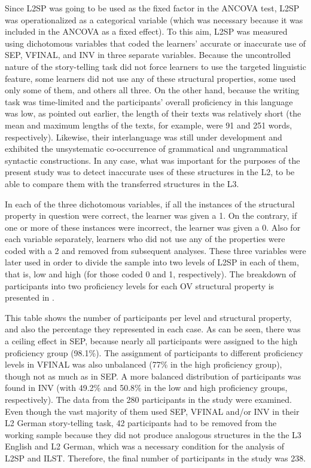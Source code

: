 \documentclass[output=paper,modfonts,nonflat, newtxmath]{langsci/langscibook}
\begin{document}
Since L2SP was going to be used as the fixed factor in the ANCOVA test, L2SP was operationalized as a categorical variable (which was necessary because it was included in the ANCOVA as a fixed effect). To this aim, L2SP was measured using dichotomous variables that coded the learners’ accurate or inaccurate use of SEP, VFINAL, and INV in three separate variables. Because the uncontrolled nature of the story-telling task did not force learners to use the targeted linguistic feature, some learners did not use any of these structural properties, some used only some of them, and others all three. On the other hand, because the writing task was time-limited and the participants’ overall proficiency in this language was low, as pointed out earlier, the length of their texts was relatively short (the mean and maximum lengths of the texts, for example, were 91 and 251 words, respectively). Likewise, their interlanguage was still under development and exhibited the unsystematic co-occurrence of grammatical and ungrammatical syntactic constructions. In any case, what was important for the purposes of the present study was to detect inaccurate uses of these structures in the L2, to be able to compare them with the transferred structures in the L3.

In each of the three dichotomous variables, if all the instances of the structural property in question were correct, the learner was given a 1. On the contrary, if one or more of these instances were incorrect, the learner was given a 0. Also for each variable separately, learners who did not use any of the properties were coded with a 2 and removed from subsequent analyses. These three variables were later used in order to divide the sample into two levels of L2SP in each of them, that is, low and high (for those coded 0 and 1, respectively). The breakdown of participants into two proficiency levels for each OV structural property is presented in .

This table shows the number of participants per level and structural property, and also the percentage they represented in each case. As can be seen, there was a ceiling effect in SEP, because nearly all participants were assigned to the high proficiency group (98.1\%). The assignment of participants to different proficiency levels in VFINAL was also unbalanced (77\% in the high proficiency group), though not as much as in SEP. A more balanced distribution of participants was found in INV (with 49.2\% and 50.8\% in the low and high proficiency groups, respectively). The data from the 280 participants in the study were examined. Even though the vast majority of them used SEP, VFINAL and/or INV in their L2 German story-telling task, 42 participants had to be removed from the working sample because they did not produce analogous structures in the the L3 English and L2 German, which was a necessary condition for the analysis of L2SP and ILST. Therefore, the final number of participants in the study was 238.
\end{document}

